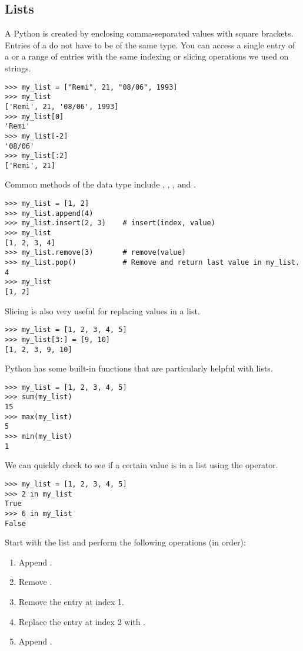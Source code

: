 
\subsection*{Lists}
A Python  is created by enclosing comma-separated values with square brackets. Entries of a  do not have to be of the same type. You can access a single entry of a  or a range of entries with the same indexing or slicing operations we used on strings. 
\begin{lstlisting}
>>> my_list = ["Remi", 21, "08/06", 1993]
>>> my_list
['Remi', 21, '08/06', 1993]
>>> my_list[0]
'Remi'
>>> my_list[-2]
'08/06'
>>> my_list[:2]
['Remi', 21]
\end{lstlisting}

Common methods of the  data type include , , , and .
\begin{lstlisting}
>>> my_list = [1, 2]
>>> my_list.append(4)
>>> my_list.insert(2, 3)	# insert(index, value)
>>> my_list
[1, 2, 3, 4]
>>> my_list.remove(3)       # remove(value)
>>> my_list.pop()           # Remove and return last value in my_list.
4
>>> my_list
[1, 2]
\end{lstlisting}

Slicing is also very useful for replacing values in a list.
\begin{lstlisting}
>>> my_list = [1, 2, 3, 4, 5]
>>> my_list[3:] = [9, 10]
[1, 2, 3, 9, 10]
\end{lstlisting}

Python has some built-in functions that are particularly helpful with lists.
\begin{lstlisting}
>>> my_list = [1, 2, 3, 4, 5]
>>> sum(my_list)
15
>>> max(my_list)
5
>>> min(my_list)
1
\end{lstlisting}

We can quickly check to see if a certain value is in a list using the  operator.
\begin{lstlisting}
>>> my_list = [1, 2, 3, 4, 5]
>>> 2 in my_list
True
>>> 6 in my_list
False
\end{lstlisting}

\begin{problem}
Start with the list  and perform the following operations (in order):
\begin{enumerate}
\item Append .
\item Remove .
\item Remove the entry at index 1.
\item Replace the entry at index 2 with .
\item Append .
\end{enumerate}
\end{problem}

